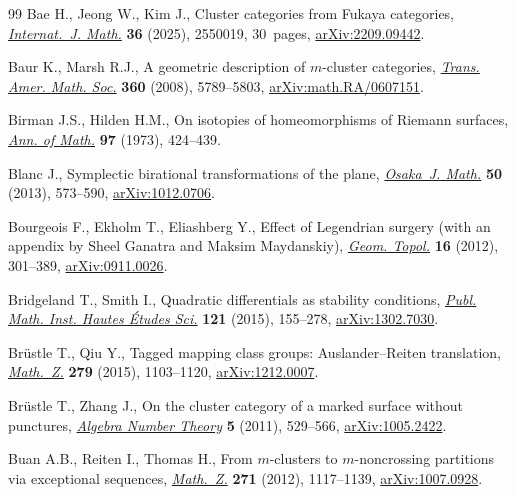 \documentclass[10pt,a4paper]{amsart}
\theoremstyle{definition}
\numberwithin{equation}{section}
\begin{document}
\begin{thebibliography}{99}
Bae H., Jeong W., Kim J., Cluster categories from {F}ukaya categories,
 \href{https://doi.org/10.1142/S0129167X25500193}{\textit{Internat.~J. Math.}}
 \textbf{36} (2025), 2550019, 30~pages,
 \href{http://arxiv.org/abs/2209.09442}{arXiv:2209.09442}.

Baur K., Marsh R.J., A geometric description of {$m$}-cluster categories,
 \href{https://doi.org/10.1090/S0002-9947-08-04441-3}{\textit{Trans. Amer.
 Math. Soc.}} \textbf{360} (2008), 5789--5803,
 \href{http://arxiv.org/abs/math.RA/0607151}{arXiv:math.RA/0607151}.

Birman J.S., Hilden H.M., On isotopies of homeomorphisms of {R}iemann surfaces,
 \href{https://doi.org/10.2307/1970830}{\textit{Ann. of Math.}} \textbf{97}
 (1973), 424--439.

Blanc J., Symplectic birational transformations of the plane,
 \href{https://doi.org/10.18910/25084}{\textit{Osaka~J. Math.}} \textbf{50}
 (2013), 573--590, \href{http://arxiv.org/abs/1012.0706}{arXiv:1012.0706}.

Bourgeois F., Ekholm T., Eliashberg Y., Effect of {L}egendrian surgery (with an
 appendix by {S}heel {G}anatra and {M}aksim {M}aydanskiy),
 \href{https://doi.org/10.2140/gt.2012.16.301}{\textit{Geom. Topol.}}
 \textbf{16} (2012), 301--389,
 \href{http://arxiv.org/abs/0911.0026}{arXiv:0911.0026}.

Bridgeland T., Smith I., Quadratic differentials as stability conditions,
 \href{https://doi.org/10.1007/s10240-014-0066-5}{\textit{Publ. Math. Inst.
 Hautes \'{E}tudes Sci.}} \textbf{121} (2015), 155--278,
 \href{http://arxiv.org/abs/1302.7030}{arXiv:1302.7030}.

Br\"{u}stle T., Qiu Y., Tagged mapping class groups: {A}uslander--{R}eiten
 translation,
 \href{https://doi.org/10.1007/s00209-015-1405-z}{\textit{Math.~Z.}}
 \textbf{279} (2015), 1103--1120,
 \href{http://arxiv.org/abs/1212.0007}{arXiv:1212.0007}.

Br\"{u}stle T., Zhang J., On the cluster category of a marked surface without
 punctures, \href{https://doi.org/10.2140/ant.2011.5.529}{\textit{Algebra
 Number Theory}} \textbf{5} (2011), 529--566,
 \href{http://arxiv.org/abs/1005.2422}{arXiv:1005.2422}.

Buan A.B., Reiten I., Thomas H., From {$m$}-clusters to {$m$}-noncrossing
 partitions via exceptional sequences,
 \href{https://doi.org/10.1007/s00209-011-0906-7}{\textit{Math.~Z.}}
 \textbf{271} (2012), 1117--1139,
 \href{http://arxiv.org/abs/1007.0928}{arXiv:1007.0928}.


\end{thebibliography}
\end{document}
